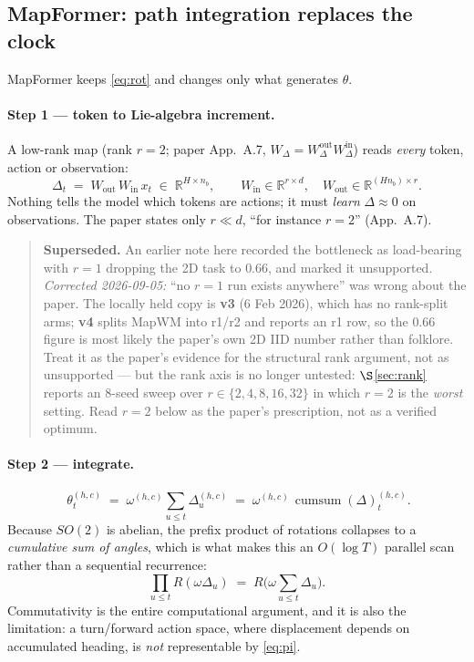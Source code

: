 \documentclass[11pt]{article}
\newcommand{\R}{\mathbb{R}}
\newcommand{\nb}{n_b}
\DeclareMathOperator*{\cumsum}{cumsum}
\begin{document}
\subsection{MapFormer: path integration replaces the clock}

MapFormer keeps \eqref{eq:rot} and changes only what generates $\theta$.

\paragraph{Step 1 --- token to Lie-algebra increment.}
A low-rank map (rank $r=2$; paper App.~A.7, $W_\Delta = W_\Delta^{\mathrm{out}}
W_\Delta^{\mathrm{in}}$) reads \emph{every} token, action or observation:
\begin{equation}
  \Delta_t \;=\; W_{\mathrm{out}}\,W_{\mathrm{in}}\,x_t \;\in\;\R^{H\times \nb},
  \qquad
  W_{\mathrm{in}}\in\R^{r\times d},\quad W_{\mathrm{out}}\in\R^{(H\nb)\times r}.
\end{equation}
Nothing tells the model which tokens are actions; it must \emph{learn}
$\Delta \approx 0$ on observations. The paper states only $r \ll d$, ``for instance
$r=2$'' (App.~A.7).

\begin{quote}\small
\textbf{Superseded.} An earlier note here recorded the bottleneck as load-bearing
with $r=1$ dropping the 2D task to $0.66$, and marked it unsupported. \emph{Corrected 2026-09-05:} ``no $r=1$ run exists
anywhere'' was wrong about the paper. The locally held copy is \textbf{v3}
(6 Feb 2026), which has no rank-split arms; \textbf{v4} splits MapWM into r1/r2
and reports an r1 row, so the $0.66$ figure is most likely the paper's own 2D IID
number rather than folklore. Treat it as the paper's evidence for the structural
rank argument, not as unsupported --- but the rank axis is no longer
untested: $\S$\ref{sec:rank} reports an $8$-seed sweep over $r\in\{2,4,8,16,32\}$
in which $r=2$ is the \emph{worst} setting. Read $r=2$ below as the paper's
prescription, not as a verified optimum.
\end{quote}

\paragraph{Step 2 --- integrate.}
\begin{equation}
  \label{eq:pi}
  \boxed{\;\theta_t^{(h,c)} \;=\; \omega^{(h,c)}\sum_{u\le t}\Delta_u^{(h,c)}
  \;=\;\omega^{(h,c)}\,\cumsum(\Delta)^{(h,c)}_t . }
\end{equation}
Because $SO(2)$ is abelian, the prefix product of rotations collapses to a
\emph{cumulative sum of angles}, which is what makes this an $O(\log T)$ parallel
scan rather than a sequential recurrence:
\begin{equation}
  \prod_{u\le t} R\!\left(\omega\Delta_u\right) \;=\; R\!\Big(\omega\textstyle\sum_{u\le t}\Delta_u\Big).
\end{equation}
Commutativity is the entire computational argument, and it is also the limitation:
a turn/forward action space, where displacement depends on accumulated heading, is
\emph{not} representable by \eqref{eq:pi}.
\end{document}
